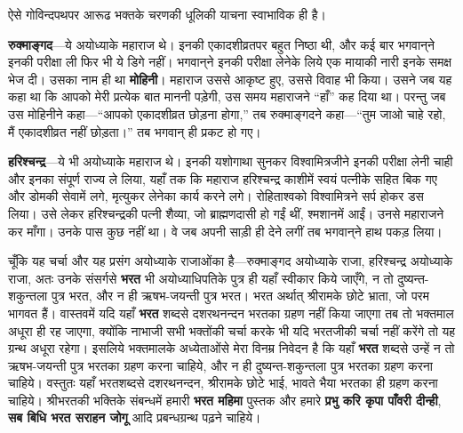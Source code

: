 \begin{sloppypar}\justifying{}
ऐसे गोविन्दपथपर आरूढ भक्तके चरणकी धूलिकी याचना स्वाभाविक ही है।
\end{sloppypar}
\begin{sloppypar}\justifying{}
\textbf{रुक्माङ्गद}—ये अयोध्याके महाराज थे। इनकी एकादशी\-व्रतपर बहुत निष्ठा थी, और कई बार भगवान्‌ने इनकी परीक्षा ली फिर भी ये डिगे नहीं। भगवान्‌ने इनकी परीक्षा लेनेके लिये एक मायाकी नारी इनके समक्ष भेज दी। उसका नाम ही था \textbf{मोहिनी}। महाराज उससे आकृष्ट हुए, उससे विवाह भी किया। उसने जब यह कहा था कि आपको मेरी प्रत्येक बात माननी पड़ेगी, उस समय महाराजने “हाँ” कह दिया था। परन्तु जब उस मोहिनीने कहा—“आपको एकादशी\-व्रत छोड़ना होगा,” तब रुक्माङ्गदने कहा—“तुम जाओ चाहे रहो, मैं एकादशी\-व्रत नहीं छोड़ता।” तब भगवान् ही प्रकट हो गए।
\end{sloppypar}
\begin{sloppypar}\justifying{}
\textbf{हरिश्चन्द्र}—ये भी अयोध्याके महाराज थे। इनकी यशोगाथा सुनकर विश्वामित्रजीने इनकी परीक्षा लेनी चाही और इनका संपूर्ण राज्य ले लिया, यहाँ तक कि महाराज हरिश्चन्द्र काशीमें स्वयं पत्नीके सहित बिक गए और डोमकी सेवामें लगे, मृत्यु\-कर लेनेका कार्य करने लगे। रोहिताश्वको विश्वामित्रने सर्प होकर डस लिया। उसे लेकर हरिश्चन्द्रकी पत्नी शैव्या, जो ब्राह्मण\-दासी हो गईं थीं, श्मशानमें आईं। उनसे महाराजने कर माँगा। उनके पास कुछ नहीं था। वे जब अपनी साड़ी ही देने लगीं तब भगवान्‌ने हाथ पकड़ लिया।
\end{sloppypar}
\begin{sloppypar}\justifying{}
चूँकि यह चर्चा और यह प्रसंग अयोध्याके राजाओंका है—रुक्माङ्गद अयोध्याके राजा, हरिश्चन्द्र अयोध्याके राजा, अतः उनके संसर्गसे \textbf{भरत} भी अयोध्याधिपतिके पुत्र ही यहाँ स्वीकार किये जाएँगे, न तो दुष्यन्त-शकुन्तला पुत्र भरत, और न ही ऋषभ-जयन्ती पुत्र भरत। भरत अर्थात् श्रीरामके छोटे भ्राता, जो परम भागवत हैं। वास्तवमें यदि यहाँ \textbf{भरत} शब्दसे दशरथनन्दन भरतका ग्रहण नहीं किया जाएगा तब तो भक्तमाल अधूरा ही रह जाएगा, क्योंकि नाभाजी सभी भक्तोंकी चर्चा करके भी यदि भरतजीकी चर्चा नहीं करेंगे तो यह ग्रन्थ अधूरा रहेगा। इसलिये भक्तमालके अध्येताओंसे मेरा विनम्र निवेदन है कि यहाँ \textbf{भरत} शब्दसे उन्हें न तो ऋषभ-जयन्ती पुत्र भरतका ग्रहण करना चाहिये, और न ही दुष्यन्त-शकुन्तला पुत्र भरतका ग्रहण करना चाहिये। वस्तुतः यहाँ भरतशब्दसे दशरथनन्दन, श्रीरामके छोटे भाई, भावते भैया भरतका ही ग्रहण करना चाहिये। श्रीभरतकी भक्तिके संबन्धमें हमारी \textbf{भरत महिमा} पुस्तक और हमारे \textbf{प्रभु करि कृपा पाँवरी दीन्ही}, \textbf{सब बिधि भरत सराहन जोगू} आदि प्रबन्धग्रन्थ पढ़ने चाहिये।
\end{sloppypar}
